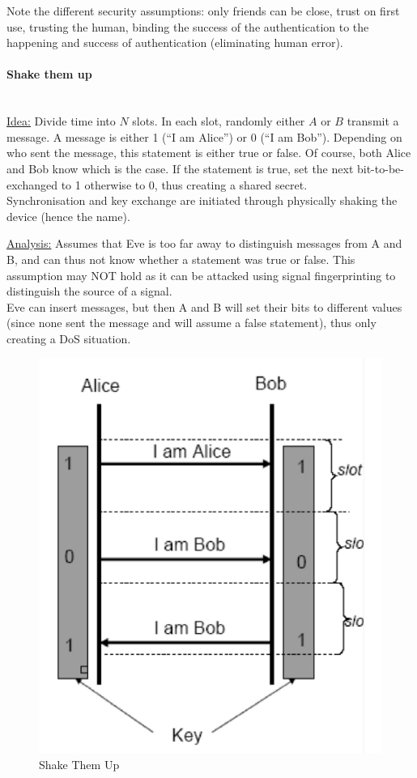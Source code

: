 Note the different security assumptions:
only friends can be close, trust on first use, trusting the human, binding the success of the authentication to the happening and success of authentication (eliminating human error).

\paragraph{Shake them up} \mbox{} \\
\underline{Idea:} 
Divide time into $N$ slots.
In each slot, randomly either $A$ or $B$ transmit a message.
A message is either 1 (``I am Alice'') or 0 (``I am Bob'').
Depending on who sent the message, this statement is either true or false.
Of course, both Alice and Bob know which is the case.
If the statement is true, set the next bit-to-be-exchanged to 1 otherwise to 0, thus creating a shared secret.
\\
Synchronisation and key exchange are initiated through physically shaking the device (hence the name).

\underline{Analysis:} 
Assumes that Eve is too far away to distinguish messages from A and B, and can thus not know whether a statement was true or false.
This assumption may NOT hold as it can be attacked using signal fingerprinting to distinguish the source of a signal.
\\
Eve can insert messages, but then A and B will set their bits to different values (since none sent the message and will assume a false statement), thus only creating a DoS situation.

\begin{figure}[h]
	\centering
	\includegraphics[scale=0.45]{images/8-shake.png}
	\caption{Shake Them Up}%
	\label{fig:shake}
\end{figure}

